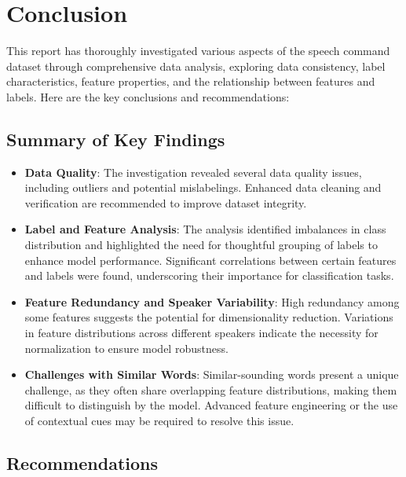 \section{Conclusion}

This report has thoroughly investigated various aspects of the speech command dataset through comprehensive data analysis, exploring data consistency, label characteristics, feature properties, and the relationship between features and labels. Here are the key conclusions and recommendations:

\subsection{Summary of Key Findings}

\begin{itemize}
    \item \textbf{Data Quality}: The investigation revealed several data quality issues, including outliers and potential mislabelings. Enhanced data cleaning and verification are recommended to improve dataset integrity.
    \item \textbf{Label and Feature Analysis}: The analysis identified imbalances in class distribution and highlighted the need for thoughtful grouping of labels to enhance model performance. Significant correlations between certain features and labels were found, underscoring their importance for classification tasks.
    \item \textbf{Feature Redundancy and Speaker Variability}: High redundancy among some features suggests the potential for dimensionality reduction. Variations in feature distributions across different speakers indicate the necessity for normalization to ensure model robustness.
    \item \textbf{Challenges with Similar Words}: Similar-sounding words present a unique challenge, as they often share overlapping feature distributions, making them difficult to distinguish by the model. Advanced feature engineering or the use of contextual cues may be required to resolve this issue.
\end{itemize}

\subsection{Recommendations}

